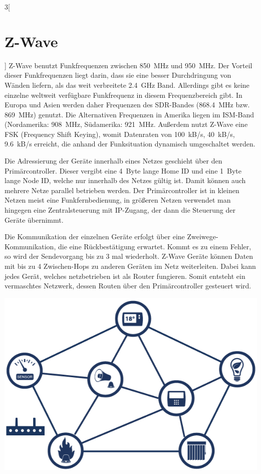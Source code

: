 \begin{multicols}{3}[\section{Z-Wave}]
Z-Wave benutzt Funkfrequenzen zwischen \SI{850}{\mega\hertz} und \SI{950}{\mega\hertz}. Der Vorteil dieser Funkfrequenzen liegt darin, dass sie eine besser Durchdringung von Wänden liefern, als das weit verbreitete \SI{2,4}{\giga\hertz} Band. Allerdings gibt es keine einzelne weltweit verfügbare Funkfrequenz in diesem Frequenzbereich gibt. In Europa und Asien werden daher Frequenzen des SDR-Bandes (\SI{868,4}{\mega\hertz} bzw. \SI{869}{\mega\hertz}) genutzt. Die Alternativen Frequenzen in Amerika liegen im ISM-Band (Nordamerika: \SI{908}{\mega\hertz}, Südamerika: \SI{921}{\mega\hertz}. Außerdem nutzt Z-Wave eine FSK (Frequency Shift Keying), womit Datenraten von \SI{100}{kB/s}, \SI{40}{kB/s}, \SI{9,6}{kB/s} erreicht, die anhand der Funksituation dynamisch umgeschaltet werden.

Die Adressierung der Geräte innerhalb eines Netzes geschieht über den Primärcontroller. Dieser vergibt eine \SI{4}{Byte} lange Home ID und eine \SI{1}{Byte} lange Node ID, welche nur innerhalb des Netzes gültig ist. Damit können auch mehrere Netze parallel betrieben werden. Der Primärcontroller ist in kleinen Netzen meist eine Funkfernbedienung, in größeren Netzen verwendet man hingegen eine Zentralsteuerung mit IP-Zugang, der dann die Steuerung der Geräte übernimmt.

Die Kommunikation der einzelnen Geräte erfolgt über eine Zweiwege-Kommunikation, die eine Rückbestätigung erwartet. Kommt es zu einem Fehler, so wird der Sendevorgang bis zu 3 mal wiederholt. Z-Wave Geräte können Daten mit bis zu 4 Zwischen-Hops zu anderen Geräten im Netz weiterleiten. Dabei kann jedes Gerät, welches netzbetrieben ist als Router fungieren. Somit entsteht ein vermaschtes Netzwerk, dessen Routen über den Primärcontroller gesteuert wird.

\begin{Figure}
\includegraphics[width=\linewidth]{Kapitel/Z-Wave/Grafiken/z-wave_mesh.png}
\label{fig:zwave_mesh}
\end{Figure}


\end{multicols}
